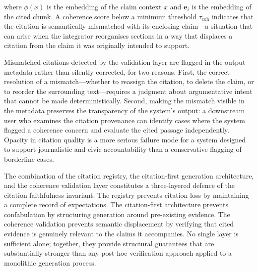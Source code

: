 where $\phi(x)$ is the embedding of the claim context $x$ and $\mathbf{e}_i$ is the embedding
of the cited chunk. A coherence score below a minimum threshold $\tau_\text{coh}$ indicates
that the citation is semantically mismatched with its enclosing claim---a situation that can
arise when the integrator reorganises sections in a way that displaces a citation from the
claim it was originally intended to support.

Mismatched citations detected by the validation layer are flagged in the output metadata rather
than silently corrected, for two reasons. First, the correct resolution of a mismatch---whether
to reassign the citation, to delete the claim, or to reorder the surrounding text---requires
a judgment about argumentative intent that cannot be made deterministically. Second, making
the mismatch visible in the metadata preserves the transparency of the system's output: a
downstream user who examines the citation provenance can identify cases where the system
flagged a coherence concern and evaluate the cited passage independently. Opacity in citation
quality is a more serious failure mode for a system designed to support journalistic and civic
accountability than a conservative flagging of borderline cases.

The combination of the citation registry, the citation-first generation architecture, and the
coherence validation layer constitutes a three-layered defence of the citation faithfulness
invariant. The registry prevents citation loss by maintaining a complete record of expectations.
The citation-first architecture prevents confabulation by structuring generation around
pre-existing evidence. The coherence validation prevents semantic displacement by verifying that
cited evidence is genuinely relevant to the claims it accompanies. No single layer is sufficient
alone; together, they provide structural guarantees that are substantially stronger than any
post-hoc verification approach applied to a monolithic generation process.
